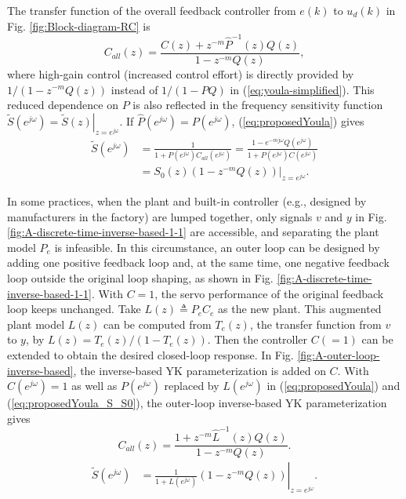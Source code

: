 \documentclass [11pt, proquest] {uwthesis}[2020/02/24]
\begin{document}
The transfer function of the overall feedback controller from $e(k)$ to $u_d(k)$ in Fig. \ref{fig:Block-diagram-RC}
is
\begin{equation}
C_{all}(z)=\frac{C(z)+z^{-m}\hat{P}^{-1}(z)Q(z)}{1-z^{-m}Q(z)},\label{eq:proposedYoula}
\end{equation}
where high-gain control (increased control effort) is directly provided
by $1/(1-z^{-m}Q(z))$ instead of $1/(1-PQ)$ in (\ref{eq:youla-simplified}).
This reduced dependence on $P$ is also reflected in the frequency
sensitivity function $\tilde{S}(e^{j\omega})=\left.\tilde{S}(z)\right|_{z=e^{j\omega}}$.
If $\hat{P}(e^{j\omega})=P(e^{j\omega})$, (\ref{eq:proposedYoula})
gives
\begin{align}
\tilde{S}(e^{j\omega}) & =\frac{1}{1+P(e^{j\omega})C_{all}(e^{j\omega})}=\frac{1-e^{-mj\omega}Q(e^{j\omega})}{1+P(e^{j\omega})C(e^{j\omega})}\nonumber \\
 & =\left.S_{0}(z)(1-z^{-m}Q(z))\right|_{z=e^{j\omega}}.\label{eq:proposedYoula_S_S0}
\end{align}

In some practices, when the plant and built-in controller (e.g.,
designed by manufacturers in the factory) are lumped together, only
signals $v$ and $y$ in Fig. \ref{fig:A-discrete-time-inverse-based-1-1}
are accessible, and separating the plant model $P_{e}$ is infeasible.
In this circumstance, an outer loop can be designed by adding one
positive feedback loop and, at the same time, one negative feedback
loop outside the original loop shaping, as shown in Fig. \ref{fig:A-discrete-time-inverse-based-1-1}.
With $C=1$, the servo performance of the original feedback loop keeps
unchanged. Take $L(z)\triangleq P_{e}C_{e}$ as the new plant. This
augmented plant model $L(z)$ can be computed from $T_{e}(z)$, the
transfer function from $v$ to $y$, by $L(z)=T_{e}(z)/(1-T_{e}(z))$.
Then the controller $C(=1)$ can be extended to obtain the desired
closed-loop response. In Fig. \ref{fig:A-outer-loop-inverse-based},
the inverse-based YK parameterization is added on $C$. With $C(e^{j\omega})=1$
as well as $P(e^{j\omega})$ replaced by $L(e^{j\omega})$ in (\ref{eq:proposedYoula})
and (\ref{eq:proposedYoula_S_S0}), the outer-loop inverse-based YK
parameterization gives
\begin{equation}
C_{all}(z)=\frac{1+z^{-m}\hat{L}^{-1}(z)Q(z)}{1-z^{-m}Q(z)}.\label{eq:outer_loop_Youla}
\end{equation}
\begin{align}
\tilde{S}(e^{j\omega}) & =\left.\frac{1}{1+L(e^{j\omega})}(1-z^{-m}Q(z))\right|_{z=e^{j\omega}}.\label{eq:L_S_frequency response}
\end{align}
\end{document}
